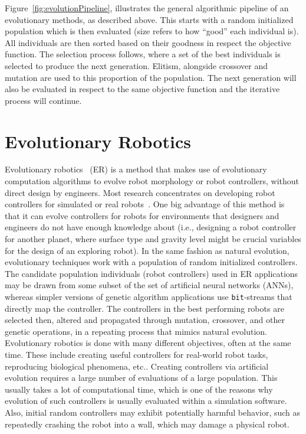 Figure~\ref{fig:evolutionPipeline}, illustrates the general algorithmic pipeline of an evolutionary methods, as described above. This starts with a random initialized population which is then evaluated (size refers to how ``good'' each individual is). All individuals are then sorted based on their goodness in respect the objective function. The selection process follows, where a set of the best individuals is selected to produce the next generation. Elitism, alongside crossover and mutation are used to this proportion of the population. The next generation will also be evaluated in respect to the same objective function and the iterative process will continue.

\section{Evolutionary Robotics}
\label{sec:evolutionary_robotics}

Evolutionary robotics~\citep{nolfi2001evolutionary} (ER) is a method that makes use of evolutionary computation algorithms to evolve robot morphology or robot controllers, without direct design by engineers. Most research concentrates on developing robot controllers for simulated or real robots~\citep{harvey1997evolutionary,nolfi1994evolve}. One big advantage of this method is that it can evolve controllers for robots for environments that designers and engineers do not have enough knowledge about (i.e., designing a robot controller for another planet, where surface type and gravity level might be crucial variables for the design of an exploring robot). In the same fashion as natural evolution, evolutionary techniques work with a population of random initialized controllers. The candidate population individuals (robot controllers) used in ER applications may be drawn from some subset of the set of artificial neural networks (ANNs), whereas simpler versions of genetic algorithm applications use \texttt{bit}-streams that directly map the controller. The controllers in the best performing robots are selected then, altered and propagated through mutation, crossover, and other genetic operations, in a repeating process that mimics natural evolution. Evolutionary robotics is done with many different objectives, often at the same time. These include creating useful controllers for real-world robot tasks, reproducing biological phenomena, etc.. Creating controllers via artificial evolution requires a large number of evaluations of a large population. This usually takes a lot of computational time, which is one of the reasons why evolution of such controllers is usually evaluated within a simulation software. Also, initial random controllers may exhibit potentially harmful behavior, such as repeatedly crashing the robot into a wall, which may damage a physical robot.

